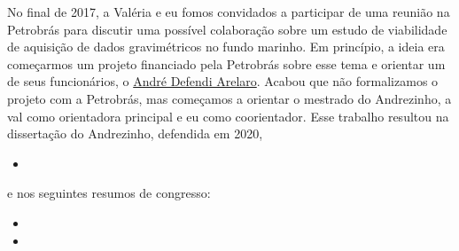 \bigskip

\noindent No final de 2017, a Valéria e eu fomos convidados a participar de uma reunião
na Petrobrás para discutir uma possível colaboração sobre um estudo de viabilidade de
aquisição de dados gravimétricos no fundo marinho. Em princípio, a ideia era começarmos 
um projeto financiado pela Petrobrás sobre esse tema e orientar um de seus funcionários,
o \href{https://lattes.cnpq.br/9144077841390825}{André Defendi Arelaro}.
Acabou que não formalizamos o projeto com a Petrobrás, mas começamos a orientar o
mestrado do Andrezinho, a val como orientadora principal e eu como coorientador.
Esse trabalho resultou na dissertação do Andrezinho, defendida em 2020,
\begin{itemize}
	\item{}
\end{itemize}
e nos seguintes resumos de congresso:
\begin{itemize}
	\item {}
	\item {}
\end{itemize}
